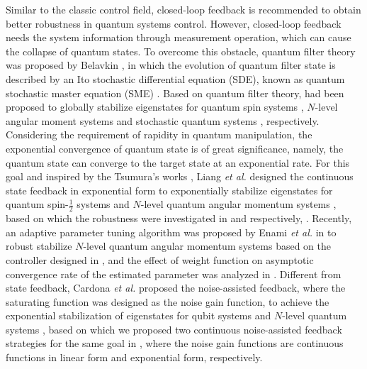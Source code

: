 \documentclass[]{elsarticle}
\begin{document}
Similar to the classic control field, closed-loop feedback is recommended to obtain better robustness in quantum systems control. However,  closed-loop feedback needs the system information through measurement operation, which can cause the collapse of quantum states. To overcome this obstacle, quantum filter theory was proposed by Belavkin \cite{BJ1983,BJ1992}, in which the evolution of quantum filter state is described by an Ito stochastic differential equation (SDE), known as quantum stochastic master equation (SME) \cite{HSMJ2005,MHJ2007,CWKMJ2016}. Based on quantum filter theory, {} had been proposed to globally stabilize eigenstates for quantum spin systems \cite{HSMJ2005}, $N$-level angular moment systems \cite{MHJ2007,TC2007,TC2008} and {\color{red}{$N$-level general}} stochastic quantum systems \cite{GVHJ2012,CWKMJ2016,LLKXJ2022}, respectively. {}
Considering the requirement of rapidity in quantum manipulation, the exponential convergence of quantum state is of great significance, namely, the quantum state can converge to the target state at an exponential rate. For this goal and inspired by the Tsumura's works \cite{GVHJ2012,CWKMJ2016,LLKXJ2022}, Liang \textit{et al.} designed the continuous state feedback in exponential form to exponentially stabilize eigenstates for quantum spin-$\frac{1}{2}$ systems \cite{LAMC2018} and $N$-level quantum angular momentum systems \cite{LAMJ2019}, based on which the robustness were investigated in \cite{LAMOn2020a} and \cite{LAMOn2020b} respectively, {}. Recently, an adaptive parameter tuning algorithm was proposed by Enami \textit{et al.} in \cite{EOC2021a} to robust stabilize $N$-level quantum angular momentum systems based on the controller designed in \cite{LAMOn2020b}, and the effect of weight function on asymptotic convergence rate of the estimated parameter was analyzed in \cite{EOC2021b}. Different from {\color{red}{usual}} state feedback, Cardona \textit{et al.} proposed the noise-assisted feedback, where the saturating function was designed as the noise gain function, to achieve the exponential stabilization of eigenstates for qubit systems \cite{CardonaPHD2019} and $N$-level quantum systems \cite{CSRJ2020}, based on which we proposed two continuous noise-assisted feedback strategies for the same goal in \cite{WSJZJ2021}, where the noise gain functions are continuous functions in linear form and exponential form, respectively. 
\end{document}
